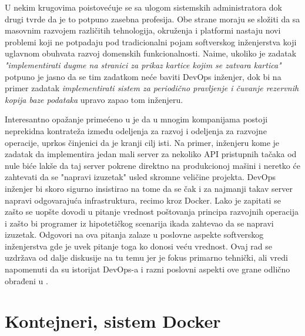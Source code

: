 \documentclass[12pt,oneside]{memoir}
\begin{document}
U nekim krugovima poistovećuje se sa ulogom sistemskih administratora dok drugi tvrde da je to potpuno zasebna profesija. Obe strane moraju se složiti da sa masovnim razvojem različitih tehnologija, okruženja i platformi nastaju novi problemi koji ne potpadaju pod tradicionalni pojam softverskog inženjerstva koji uglavnom obuhvata razvoj domenskih funkcionalnosti. Naime, ukoliko je zadatak \textit{"implementirati dugme na stranici za prikaz kartice kojim se zatvara kartica"} potpuno je jasno da se tim zadatkom neće baviti DevOps inženjer, dok bi na primer zadatak \textit{implementirati sistem za periodično pravljenje i čuvanje rezervnih kopija baze podataka} upravo zapao tom inženjeru.

Interesantno opažanje primećeno u \cite{devopshandbook} je da u mnogim kompanijama postoji neprekidna kontrateža između odeljenja za razvoj i odeljenja za razvojne operacije, uprkos činjenici da je kranji cilj isti. Na primer, inženjeru kome je zadatak da implementira jedan mali server za nekoliko API pristupnih tačaka od nule biće lakše da taj server pokrene direktno na produkcionoj mašini i neretko će zahtevati da se "napravi izuzetak" usled skromne veličine projekta. DevOps inženjer bi skoro sigurno insistirao na tome da se čak i za najmanji takav server napravi odgovarajuća infrastruktura, recimo kroz Docker. Lako je zapitati se zašto se uopšte dovodi u pitanje vrednost poštovanja principa razvojnih operacija i zašto bi programer iz hipotetičkog scenarija ikada zahtevao da se napravi izuzetak. Odgovori na ova pitanja zalaze u poslovne aspekte softverskog inženjerstva gde je uvek pitanje toga ko donosi veću vrednost. Ovaj rad se uzdržava od dalje diskusije na tu temu jer je fokus primarno tehnički, ali vredi napomenuti da su istorijat DevOps-a i razni poslovni aspekti ove grane odlično obrađeni u \cite{devopshandbook}.


\section{Kontejneri, sistem Docker}
\end{document}
